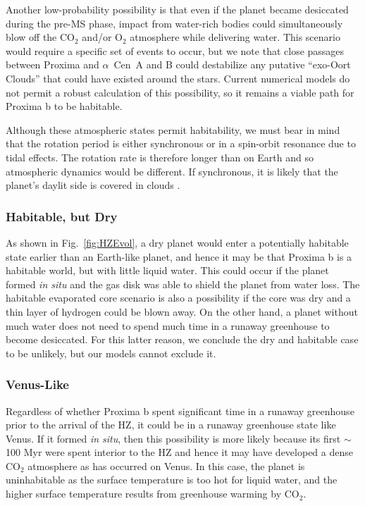 \documentclass[preprint,12pt]{aastex}
\def\acen{{$\alpha$~Cen}}
\begin{document}
Another low-probability possibility is that even if the planet became
desiccated during the pre-MS phase, impact from water-rich bodies
could simultaneously blow off the CO$_2$ and/or O$_2$ atmosphere while
delivering water. This scenario would require a specific set of events
to occur, but we note that close passages between Proxima and \acen~A
and B could destabilize any putative ``exo-Oort Clouds'' that could
have existed around the stars. Current numerical models do not permit
a robust calculation of this possibility, so it remains a viable path
for Proxima b to be habitable.

Although these atmospheric states permit habitability, we must bear in
mind that the rotation period is either synchronous or in a spin-orbit
resonance due to tidal effects. The rotation rate is therefore longer
than on Earth and so atmospheric dynamics would be different. If
synchronous, it is likely that the planet's daylit side is
covered in clouds \citep{Yang13}.

\subsubsection{Habitable, but Dry}

As shown in Fig.~\ref{fig:HZEvol}, a dry planet would enter a
potentially habitable state earlier than an Earth-like planet, and
hence it may be that Proxima b is a habitable world, but with little
liquid water. This could occur if the planet formed {\it in situ} and
the gas disk was able to shield the planet from water loss. The
habitable evaporated core scenario is also a possibility if the core
was dry and a thin layer of hydrogen could be blown away. On the other
hand, a planet without much water does not need to spend much time in
a runaway greenhouse to become desiccated. For this latter reason, we
conclude the dry and habitable case to be unlikely, but our models
cannot exclude it.

\subsubsection{Venus-Like}
\label{sec:results:atmstates:venuslike}

Regardless of whether Proxima b spent significant time in a runaway
greenhouse prior to the arrival of the HZ, it could be in a runaway
greenhouse state like Venus. If it formed {\it in situ}, then this
possibility is more likely because its first $\sim$100 Myr were spent
interior to the HZ and hence it may have developed a dense CO$_2$
atmosphere as has occurred on Venus. In this case, the planet is
uninhabitable as the surface temperature is too hot for liquid water,
and the higher surface temperature results from greenhouse warming by
CO$_2$.
\end{document}
